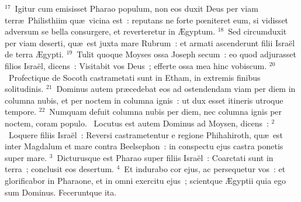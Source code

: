 ${}^{17}$~Igitur cum emisisset Pharao populum, non eos duxit Deus per viam terr\ae\ Philisthiim qu\ae\ vicina est~: reputans ne forte pœniteret eum, si vidisset adversum se bella consurgere, et reverteretur in \AE gyptum.
${}^{18}$~Sed circumduxit per viam deserti, qu\ae\ est juxta mare Rubrum~: et armati ascenderunt filii Isra\"el de terra \AE gypti.
${}^{19}$~Tulit quoque Moyses ossa Joseph secum~: eo quod adjurasset filios Isra\"el, dicens~: Visitabit vos Deus~; efferte ossa mea hinc vobiscum.
${}^{20}$~Profectique de Socoth castrametati sunt in Etham, in extremis finibus solitudinis.
${}^{21}$~Dominus autem pr\ae cedebat eos ad ostendendam viam per diem in columna nubis, et per noctem in columna ignis~: ut dux esset itineris utroque tempore.
${}^{22}$~Numquam defuit columna nubis per diem, nec columna ignis per noctem, coram populo.
~\lettrine[lines=10,image=true,loversize=0.05,lraise=-0.03]{L}{}ocutus est autem Dominus ad Moysen, dicens~:
${}^{2}$~Loquere filiis Isra\"el~: Reversi castrametentur e regione Phihahiroth, qu\ae\ est inter Magdalum et mare contra Beelsephon~: in conspectu ejus castra ponetis super mare.
${}^{3}$~Dicturusque est Pharao super filiis Isra\"el~: Coarctati sunt in terra~; conclusit eos desertum.
${}^{4}$~Et indurabo cor ejus, ac persequetur vos~: et glorificabor in Pharaone, et in omni exercitu ejus~; scientque \AE gyptii quia ego sum Dominus. Feceruntque ita.


